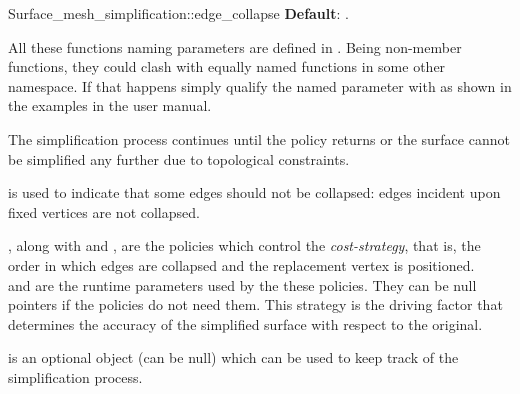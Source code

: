 \begin{ccRefFunction}{Surface_mesh_simplification::edge_collapse}
\textbf{Default}: .

All these functions naming parameters are defined in
. Being non-member functions, they could clash
with equally named functions in some other namespace. If that happens
simply qualify the named parameter with  as shown in the
examples in the user manual.


The simplification process continues until the  policy returns 
or the surface cannot be simplified any further due to topological constraints.

 is used to indicate that some edges should not be
collapsed: edges incident upon fixed vertices are not collapsed.

, along with  and ,
are the policies which control the {\em cost-strategy}, that is, 
the order in which edges are collapsed and the replacement vertex is positioned.\\
 and  are the runtime 
parameters used by the these policies. They can be null pointers
if the policies do not need them. This strategy is the driving factor that determines the accuracy of the
simplified surface with respect to the original.

 is an optional object (can be null) which can be used
to keep track of the simplification process.

\end{ccRefFunction}



